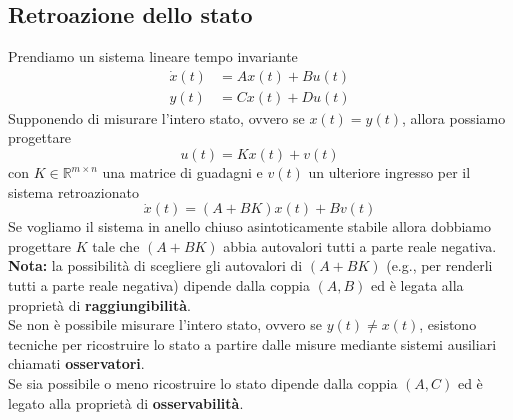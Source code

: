 \documentclass{article}
\numberwithin{equation}{subsection}
\let\oldsubsection\subsection%
\renewcommand{\subsection}{%
  \renewcommand{\theequation}{\thesubsection.\arabic{equation}}%
  \oldsubsection}%
\begin{document}
\subsection{Retroazione dello stato}
Prendiamo un sistema lineare tempo invariante
\begin{align*}
    \dot x(t) &= Ax(t) + Bu(t)\\
    y(t) &= Cx(t) + Du(t) 
\end{align*}
Supponendo di misurare l'intero stato, ovvero se $x(t)=y(t)$, allora possiamo progettare
\begin{equation}
    u(t) = Kx(t) + v(t)
\end{equation}
con $K \in \mathbb{R}^{m \times n}$ una matrice di guadagni e $v(t)$ un ulteriore ingresso per il sistema retroazionato
\begin{equation}
    \dot x(t) = (A+BK)x(t)+Bv(t)
\end{equation}
Se vogliamo il sistema in anello chiuso asintoticamente stabile allora dobbiamo progettare $K$ tale che $(A + BK)$ abbia autovalori tutti a parte reale negativa.\\
\textbf{Nota:} la possibilità di scegliere gli autovalori di $(A + BK)$ (e.g., per renderli tutti a parte reale negativa) dipende dalla coppia $(A, B)$ ed è legata alla proprietà di \textbf{raggiungibilità}.
\vspace*{0.1cm}\\
Se non è possibile misurare l'intero stato, ovvero se $y(t) \neq x(t)$, esistono tecniche per ricostruire lo stato a partire dalle misure mediante sistemi ausiliari chiamati \textbf{osservatori}.\\
Se sia possibile o meno ricostruire lo stato dipende dalla coppia $(A, C)$ ed è legato alla proprietà di \textbf{osservabilità}.
\end{document}
